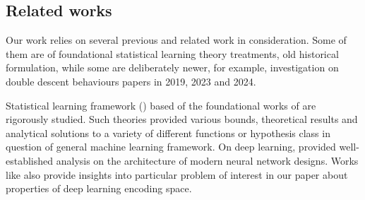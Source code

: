 \documentclass[10pt]{article}
\begin{document}
\subsection{Related works}
Our work relies on several previous and related work in consideration. Some of them are of foundational statistical learning theory treatments, old historical formulation, while some are deliberately newer, for example, investigation on double descent behaviours papers in 2019, 2023 and 2024. 

Statistical learning framework (\cite{STL_Hajek_Maxim_2021,10.5555/2371238,10.5555/2621980}) based of the foundational works of \cite{Vapnik1999-VAPTNO} are rigorously studied. Such theories provided various bounds, theoretical results and analytical solutions to a variety of different functions or hypothesis class in question of general machine learning framework. On deep learning, \cite{goodfellow2016deep,zhang2023divedeeplearning} provided well-established analysis on the architecture of modern neural network designs. Works like \cite{janik2021complexitydeepneuralnetworks,hu2021modelcomplexitydeeplearning} also provide insights into particular problem of interest in our paper about properties of deep learning encoding space. 
\end{document}
